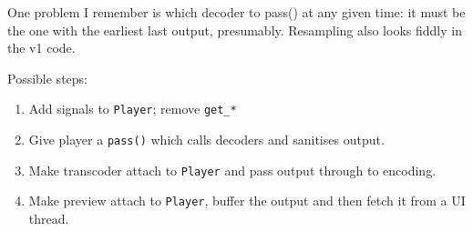 \documentclass{article}
\begin{document}
One problem I remember is which decoder to pass() at any given time:
it must be the one with the earliest last output, presumably.
Resampling also looks fiddly in the v1 code.

Possible steps:
\begin{enumerate}
\item Add signals to \texttt{Player}; remove \texttt{get\_*}
\item Give player a \texttt{pass()} which calls decoders and sanitises
  output.
\item Make transcoder attach to \texttt{Player} and pass output through to encoding.
\item Make preview attach to \texttt{Player}, buffer the output and then fetch it from a UI thread.
\end{enumerate}
\end{document}
